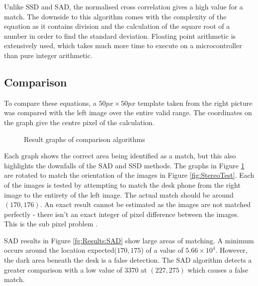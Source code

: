 Unlike SSD and SAD, the normalised cross correlation gives a high value for a match. The downside to this algorithm comes with the complexity of the equation as it contains division and the calculation of the square root of a number in order to find the standard deviation. 
Floating point arithmetic is extensively used, which takes much more time to execute on a microcontroller than pure integer arithmetic.



\subsection{Comparison}

To compare these equations, a $50px \times 50px$ template taken from the right picture was compared with the left image over the entire valid range. The coordinates on the graph give the centre pixel of the calculation. 

\begin{figure}
\centering
{}
\caption{Result graphs of comparison algorithms}
\label{fg:CompResults}
\end{figure}

Each graph shows the correct area being identified as a match, but this also highlights the downfalls of the SAD and SSD methods. The graphs in Figure \ref{fg:CompResults} are rotated to match the orientation of the images in Figure \ref{fig:StereoTest}. Each of the images is tested by attempting to match the desk phone from the right image to the entirety of the left image. The actual match should be around $(170, 176)$. An exact result cannot be estimated as the images are not matched perfectly - there isn't an exact integer of pixel difference between the images. This is the sub pixel problem \citep{haller2012design}.

SAD results in Figure \ref{fg:Results:SAD} show large areas of matching. A minimum occurs around the location expected($170,175$) of a value of $5.66\times 10^4$. 
However, the dark area beneath the desk is a false detection. The SAD algorithm detects a greater comparison with a low value of $3370$ at $(227, 275)$ which causes a false match.

